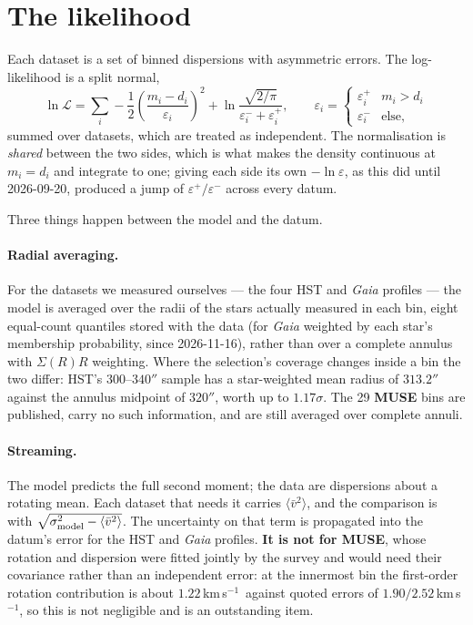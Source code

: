 \documentclass[11pt,a4paper]{article}
\newcommand{\kms}{km\,s$^{-1}$}
\begin{document}
\section{The likelihood}

Each dataset is a set of binned dispersions with asymmetric errors. The log-likelihood is a
split normal,
\begin{equation}
\ln \mathcal{L} = \sum_i -\frac{1}{2}\left(\frac{m_i-d_i}{\varepsilon_i}\right)^2
                  + \ln\frac{\sqrt{2/\pi}}{\varepsilon_i^{-}+\varepsilon_i^{+}}, \qquad
\varepsilon_i = \begin{cases}\varepsilon_i^{+} & m_i > d_i\\ \varepsilon_i^{-} & \text{else,}\end{cases}
\end{equation}
summed over datasets, which are treated as independent. The normalisation is \emph{shared}
between the two sides, which is what makes the density continuous at $m_i=d_i$ and integrate
to one; giving each side its own $-\ln\varepsilon$, as this did until 2026-09-20, produced a
jump of $\varepsilon^{+}/\varepsilon^{-}$ across every datum.

Three things happen between the model and the datum.

\paragraph{Radial averaging.} For the datasets we measured ourselves --- the four HST and
\emph{Gaia} profiles --- the model is averaged over the radii of the stars actually measured
in each bin, eight equal-count quantiles stored with the data (for \emph{Gaia} weighted by
each star's membership probability, since 2026-11-16), rather than over a complete
annulus with $\Sigma(R)R$ weighting. Where the selection's coverage changes inside a bin the
two differ: HST's $300$--$340''$ sample has a star-weighted mean radius of $313.2''$ against
the annulus midpoint of $320''$, worth up to $1.17\sigma$. The 29 \textbf{MUSE} bins are
published, carry no such information, and are still averaged over complete annuli.

\paragraph{Streaming.} The model predicts the full second moment; the data are dispersions
about a rotating mean. Each dataset that needs it carries $\langle\bar v^2\rangle$, and the
comparison is with $\sqrt{\sigma_{\rm model}^2-\langle\bar v^2\rangle}$. The uncertainty on
that term is propagated into the datum's error for the HST and \emph{Gaia} profiles.
\textbf{It is not for MUSE}, whose rotation and dispersion were fitted jointly by the survey
and would need their covariance rather than an independent error: at the innermost bin the
first-order rotation contribution is about $1.22$\,\kms\ against quoted errors of
$1.90/2.52$\,\kms, so this is not negligible and is an outstanding item.
\end{document}
